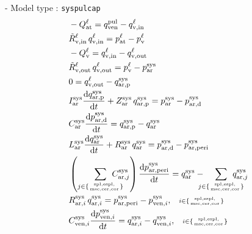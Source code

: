 \documentclass[a4paper,12pt]{report}
\begin{document}
- Model type : \verb.syspulcap.\\

\begin{align}
&-Q_{\mathrm{at}}^{\ell} = q_{\mathrm{ven}}^{\mathrm{pul}} - q_{\mathrm{v,in}}^{\ell}\nonumber\\
&\tilde{R}_{\mathrm{v,in}}^{\ell}\,q_{\mathrm{v,in}}^{\ell} = p_{\mathrm{at}}^{\ell}-p_{\mathrm{v}}^{\ell}\nonumber\\
&-Q_{\mathrm{v}}^{\ell} = q_{\mathrm{v,in}}^{\ell} - q_{\mathrm{v,out}}^{\ell}\nonumber\\
&\tilde{R}_{\mathrm{v,out}}^{\ell}\,q_{\mathrm{v,out}}^{\ell} = p_{\mathrm{v}}^{\ell}-p_{\mathrm{ar}}^{\mathrm{sys}}\nonumber\\
&0 = q_{\mathrm{v,out}}^{\ell} - q_{\mathrm{ar,p}}^{\mathrm{sys}}\nonumber\\
&I_{\mathrm{ar}}^{\mathrm{sys}} \frac{\mathrm{d}q_{\mathrm{ar,p}}^{\mathrm{sys}}}{\mathrm{d}t} + Z_{\mathrm{ar}}^{\mathrm{sys}}\,q_{\mathrm{ar,p}}^{\mathrm{sys}}=p_{\mathrm{ar}}^{\mathrm{sys}}-p_{\mathrm{ar,d}}^{\mathrm{sys}}\nonumber\\
&C_{\mathrm{ar}}^{\mathrm{sys}} \frac{\mathrm{d}p_{\mathrm{ar,d}}^{\mathrm{sys}}}{\mathrm{d}t} = q_{\mathrm{ar,p}}^{\mathrm{sys}} - q_{\mathrm{ar}}^{\mathrm{sys}}\nonumber\\
&L_{\mathrm{ar}}^{\mathrm{sys}}\frac{\mathrm{d}q_{\mathrm{ar}}^{\mathrm{sys}}}{\mathrm{d}t} + R_{\mathrm{ar}}^{\mathrm{sys}}\,q_{\mathrm{ar}}^{\mathrm{sys}}=p_{\mathrm{ar,d}}^{\mathrm{sys}} -p_{\mathrm{ar,peri}}^{\mathrm{sys}}\nonumber\\
&\left(\sum_{j\in\{\mathrm{spl,espl,\atop msc,cer,cor}\}}\!\!\!\!\!\!\!\!\!C_{\mathrm{ar},j}^{\mathrm{sys}}\right) \frac{\mathrm{d}p_{\mathrm{ar,peri}}^{\mathrm{sys}}}{\mathrm{d}t} = q_{\mathrm{ar}}^{\mathrm{sys}}-\!\!\!\!\!\sum_{j\in\{\mathrm{spl,espl,\atop msc,cer,cor}\}}\!\!\!\!\!\!\!\!\!q_{\mathrm{ar},j}^{\mathrm{sys}}\nonumber\\
&R_{\mathrm{ar},i}^{\mathrm{sys}}\,q_{\mathrm{ar},i}^{\mathrm{sys}} = p_{\mathrm{ar,peri}}^{\mathrm{sys}} - p_{\mathrm{ven},i}^{\mathrm{sys}}, \quad\scriptstyle{i\in\{\mathrm{spl,espl,\atop msc,cer,cor}\}}\nonumber\\
&C_{\mathrm{ven},i}^{\mathrm{sys}} \frac{\mathrm{d}p_{\mathrm{ven},i}^{\mathrm{sys}}}{\mathrm{d}t} = q_{\mathrm{ar},i}^{\mathrm{sys}} - q_{\mathrm{ven},i}^{\mathrm{sys}}, \quad\scriptstyle{i\in\{\mathrm{spl,espl,\atop msc,cer,cor}\}}\nonumber\\

\end{align}
\end{document}
